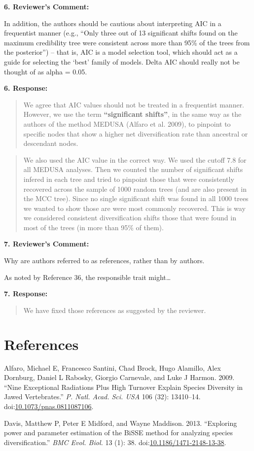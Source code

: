 \documentclass[]{article}
\begin{document}
\textbf{6. Reviewer's Comment:}

In addition, the authors should be cautious about interpreting AIC in a
frequentist manner (e.g., ``Only three out of 13 significant shifts
found on the maximum credibility tree were consistent across more than
95\% of the trees from the posterior'') -- that is, AIC is a model
selection tool, which should act as a guide for selecting the `best'
family of models. Delta AIC should really not be thought of as alpha =
0.05.

\textbf{6. Response:}

\begin{quote}
\color{blue}
We agree that AIC values should not be treated in a frequentist manner.
However, we use the term \textbf{``significant shifts''}, in the same
way as the authors of the method MEDUSA (Alfaro et al. 2009), to
pinpoint to specific nodes that show a higher net diversification rate
than ancestral or descendant nodes.
\end{quote}

\begin{quote}
\color{blue}
We also used the AIC value in the correct way. We used the cutoff 7.8
for all MEDUSA analyses. Then we counted the number of significant
shifts infered in each tree and tried to pinpoint those that were
consistently recovered across the sample of 1000 random trees (and are
also present in the MCC tree). Since no single significant shift was
found in all 1000 trees we wanted to show those are were most commonly
recovered. This is way we considered consistent diversification shifts
those that were found in most of the trees (in more than 95\% of them).
\end{quote}

\textbf{7. Reviewer's Comment:}

Why are authors referred to as references, rather than by authors.

As noted by Reference 36, the responsible trait might\ldots{}

\textbf{7. Response:}

\begin{quote}
\color{blue}
We have fixed those references as suggested by the reviewer.
\end{quote}

\section*{References}\label{references}

Alfaro, Michael E, Francesco Santini, Chad Brock, Hugo Alamillo, Alex
Dornburg, Daniel L Rabosky, Giorgio Carnevale, and Luke J Harmon. 2009.
``Nine Exceptional Radiations Plus High Turnover Explain Species
Diversity in Jawed Vertebrates.'' \emph{P. Natl. Acad. Sci. USA} 106
(32): 13410--14.
doi:\href{http://dx.doi.org/10.1073/pnas.0811087106}{10.1073/pnas.0811087106}.

Davis, Matthew P, Peter E Midford, and Wayne Maddison. 2013. ``Exploring
power and parameter estimation of the BiSSE method for analyzing species
diversification.'' \emph{BMC Evol. Biol.} 13 (1): 38.
doi:\href{http://dx.doi.org/10.1186/1471-2148-13-38}{10.1186/1471-2148-13-38}.
\end{document}

